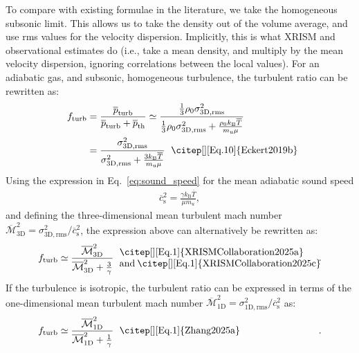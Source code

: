 \documentclass[]{article}
\begin{document}
To compare with existing formulae in the literature, we take the homogeneous subsonic limit. This allows us to take the density out of the volume average, and use rms values for the velocity dispersion. Implicitly, this is what XRISM and observational estimates do (i.e., take a mean density, and multiply by the mean velocity dispersion, ignoring correlations between the local values).
%
For an adiabatic gas, and subsonic, homogeneous turbulence, the turbulent ratio can be rewritten as:
%
\begin{align}
	f_{\mathrm{turb}} &= \frac{ \overline{p}_{\mathrm{turb}}}{ \overline{p}_{\mathrm{turb}} +   \overline{p}_{\mathrm{th}}} \simeq \frac{\frac{1}{3}  \rho_0 \sigma_{\mathrm{3D,rms}}^2}{\frac{1}{3}  \rho_0 \sigma_{\mathrm{3D,rms}}^2 + \frac{\rho_0 k_{\mathrm{B}}\overline{T}}{m_\mathrm{u} \mu}} \nonumber \\
	&= \frac{\sigma_{\mathrm{3D,rms}}^2}{\sigma_{\mathrm{3D,rms}}^2 + \frac{3  k_{\mathrm{B}}\overline{T}}{m_\mathrm{u} \mu}} \begin{tabular}{p{12em}}
		\citep[][Eq.10]{Eckert2019b}
	\end{tabular}
\end{align}
%
Using the expression in Eq.~\ref{eq:sound_speed} for the mean adiabatic sound speed
%
\begin{align}
	\overline{c}_\mathrm{s}^2 = \frac{\gamma k_\mathrm{B} \overline{T}}{\mu m_u},
\end{align}
%
and defining the three-dimensional mean turbulent mach number $\overline{\mathcal{M}}_{\mathrm{3D}}^2 = \sigma_{\mathrm{3D,rms}}^2 / \overline{c}_\mathrm{s}^2$, the expression above can alternatively be rewritten as:
%
\begin{align}
	f_{\mathrm{turb}} \simeq \frac{\overline{\mathcal{M}}_{\mathrm{3D}}^2}{\overline{\mathcal{M}}_{\mathrm{3D}}^2 + \frac{3}{\gamma}}  \begin{tabular}{p{20em}}
		\citep[][Eq.1]{XRISMCollaboration2025a} and \citep[][Eq.1]{XRISMCollaboration2025c}
	\end{tabular}.
\end{align}
%
If the turbulence is isotropic, the turbulent ratio can be expressed in terms of the one-dimensional mean turbulent mach number $\overline{\mathcal{M}}_{\mathrm{1D}}^2 = \sigma_{\mathrm{1D,rms}}^2 / \overline{c}_\mathrm{s}^2$ as:
%
\begin{align}
	f_{\mathrm{turb}} \simeq \frac{\overline{\mathcal{M}}_{\mathrm{1D}}^2}{\overline{\mathcal{M}}_{\mathrm{1D}}^2 + \frac{1}{\gamma}}  \begin{tabular}{p{20em}}
		\citep[][Eq.1]{Zhang2025a} 
	\end{tabular}.
\end{align}

\printbibliography
\end{document}
